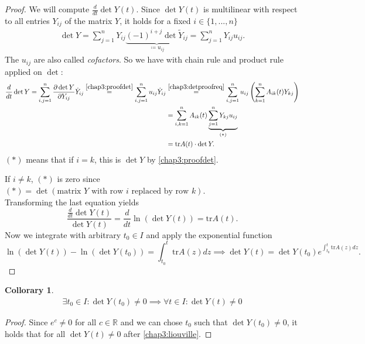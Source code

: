 \documentclass[hidelinks,a4paper, 11pt]{article}
\theoremstyle{plain}
\newtheorem{collorary}[theorem]{Collorary}
\theoremstyle{break}
\theoremstyle{plain}
\theoremstyle{definition}
\begin{document}
\begin{proof}
	We will compute $\frac{d}{dt}\det Y(t)$. Since $\det Y(t)$ is multilinear with respect to all entries $Y_{ij}$ of the matrix $Y$, it holds for a fixed $i \in \{1,...,n\}$
	\begin{align}\label{chap3:proofdet}
		\det Y = \sum^n_{j=1} Y_{ij} \underbrace{(-1)^{i+j} \det \tilde Y_{ij}}_{\coloneqq u_{ij}} = \sum^n_{j=1} Y_{ij}u_{ij}.
	\end{align}
	The $u_{ij}$ are also called \emph{cofactors}. So we have with chain rule and product rule applied on $\det$:
	\begin{align*}
		\frac{d}{dt}\det Y = \sum^n_{i,j = 1} \frac{\partial \det Y}{\partial Y_{ij}} \dot Y_{ij} \overset{\eqref{chap3:proofdet}}{=} \sum^n_{i,j = 1}u_{ij} \dot Y_{ij} &\overset{\eqref{chap3:detproofreq}}{=} \sum^n_{i,j = 1}u_{ij} \left( \sum^n_{k=1} A_{ik}(t)Y_{kj} \right) \\
		&= \sum^n_{i,k = 1}A_{ik}(t)\underbrace{\sum^n_{j=1} Y_{kj}u_{ij}}_{(*)} \\
		&= \mathrm{tr}A(t) \cdot \det Y.
	\end{align*}
	$(*)$ means that if $i=k$, this is $\det Y$ by \eqref{chap3:proofdet}.
	
	If $i \neq k$, $(*)$ is zero since $(*) = \det(\text{matrix } Y \text{ with row } i \text{ replaced by row }k)$.
	\\	
	
	Transforming the last equation yields
	\[
		\frac{\frac{d}{dt}\det Y(t)}{\det Y(t)} = \frac{d}{dt}\ln(\det Y(t)) = \mathrm{tr}A(t).
	\]
	Now we integrate with arbitrary $t_0 \in I$ and apply the exponential function
	\[
		\ln(\det Y(t)) - \ln(\det Y(t_0)) = \int^t_{t_0}\mathrm{tr}A(z)dz \implies \det Y(t) = \det Y(t_0)e^{\int^t_{t_0}\mathrm{tr}A(z)dz }.
	\]
\end{proof}

\begin{collorary}\label{chap3:colloraryliouville}
	\begin{align}\label{chap3:colloraryliouvilleeq}
		\exists t_0 \in I: \det Y(t_0) \neq 0 \implies \forall t \in I: \det Y(t) \neq 0
	\end{align}
\end{collorary}
\begin{proof}
	Since $e^c \neq 0$ for all $c \in \mathbb R$ and we can chose $t_0$ such that $\det Y(t_0) \neq 0$, it holds that for all $\det Y(t) \neq 0$ after \eqref{chap3:liouville}.
\end{proof}
\end{document}
